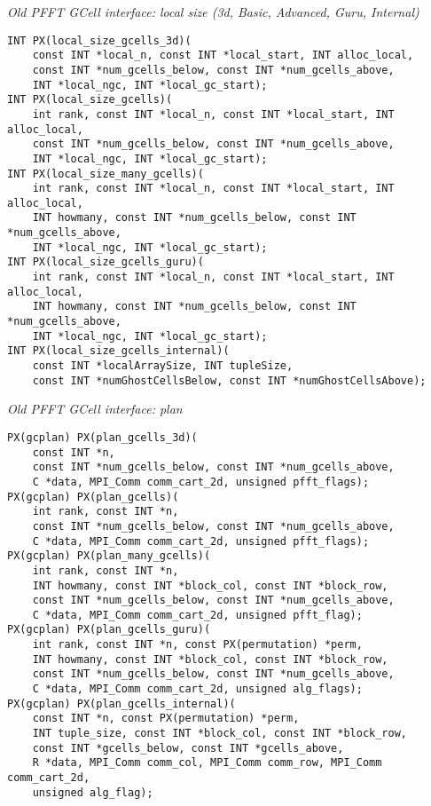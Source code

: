 \emph{Old PFFT GCell interface: local size (3d, Basic, Advanced, Guru, Internal)}
\begin{verbatim}
INT PX(local_size_gcells_3d)(
    const INT *local_n, const INT *local_start, INT alloc_local,
    const INT *num_gcells_below, const INT *num_gcells_above,
    INT *local_ngc, INT *local_gc_start);
INT PX(local_size_gcells)(
    int rank, const INT *local_n, const INT *local_start, INT alloc_local,
    const INT *num_gcells_below, const INT *num_gcells_above,
    INT *local_ngc, INT *local_gc_start);
INT PX(local_size_many_gcells)(
    int rank, const INT *local_n, const INT *local_start, INT alloc_local,
    INT howmany, const INT *num_gcells_below, const INT *num_gcells_above,
    INT *local_ngc, INT *local_gc_start);
INT PX(local_size_gcells_guru)(
    int rank, const INT *local_n, const INT *local_start, INT alloc_local,
    INT howmany, const INT *num_gcells_below, const INT *num_gcells_above,
    INT *local_ngc, INT *local_gc_start);
INT PX(local_size_gcells_internal)(
    const INT *localArraySize, INT tupleSize,
    const INT *numGhostCellsBelow, const INT *numGhostCellsAbove);
\end{verbatim}

\emph{Old PFFT GCell interface: plan}
\begin{verbatim}
PX(gcplan) PX(plan_gcells_3d)(
    const INT *n,
    const INT *num_gcells_below, const INT *num_gcells_above,
    C *data, MPI_Comm comm_cart_2d, unsigned pfft_flags);
PX(gcplan) PX(plan_gcells)(
    int rank, const INT *n,
    const INT *num_gcells_below, const INT *num_gcells_above,
    C *data, MPI_Comm comm_cart_2d, unsigned pfft_flags);
PX(gcplan) PX(plan_many_gcells)(
    int rank, const INT *n,
    INT howmany, const INT *block_col, const INT *block_row,
    const INT *num_gcells_below, const INT *num_gcells_above,
    C *data, MPI_Comm comm_cart_2d, unsigned pfft_flag);
PX(gcplan) PX(plan_gcells_guru)(
    int rank, const INT *n, const PX(permutation) *perm,
    INT howmany, const INT *block_col, const INT *block_row,
    const INT *num_gcells_below, const INT *num_gcells_above,
    C *data, MPI_Comm comm_cart_2d, unsigned alg_flags);
PX(gcplan) PX(plan_gcells_internal)(
    const INT *n, const PX(permutation) *perm,
    INT tuple_size, const INT *block_col, const INT *block_row,
    const INT *gcells_below, const INT *gcells_above,
    R *data, MPI_Comm comm_col, MPI_Comm comm_row, MPI_Comm comm_cart_2d,
    unsigned alg_flag);
\end{verbatim}


